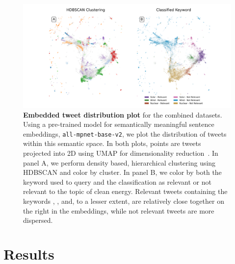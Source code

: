 \begin{figure}
  \centerfloat	
        \includegraphics[width=2.8\columnwidth]{figures/combined_labeled_embedding_horizontal.png} 
  \caption{\textbf{Embedded tweet distribution plot} for the combined datasets.
  Using a pre-trained model for semantically meaningful sentence embeddings, \texttt{all-mpnet-base-v2}, we plot the distribution of tweets within this semantic space.
  In both plots, points are tweets projected into 2D using UMAP for dimensionality reduction~\cite{mcinnes2018umap}.
  In panel A, we perform density based, hierarchical clustering using HDBSCAN and color by cluster.
  In panel B, we color by both the keyword used to query and the classification as relevant or not relevant to the topic of clean energy. 
  Relevant tweets containing the keywords , , and, to a lesser extent,  are relatively close together on the right in the embeddings, while not relevant tweets are more dispersed.} 
    \label{fig:combined_embeddings}
\end{figure}


\subsection{}


















\section{Results}
\label{sec:corpusCreation.results}






